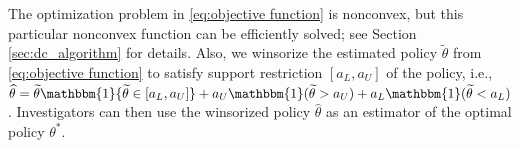 \documentclass[12pt]{article}
\newtheorem{remark}{Remark}
\newcommand{\E}{\mathbb{E}}
\newcommand{\R}{\mathbb{R}}
\newcommand{\ind}{\mathbbm{1}}
\begin{document}
The optimization problem in \eqref{eq:objective function} is nonconvex, but this particular nonconvex function can be efficiently solved; see Section \ref{sec:dc_algorithm} for details. Also, we winsorize the estimated policy $\widetilde{\theta}$ from \ref{eq:objective function} to satisfy support restriction $[a_L,a_U]$ of the policy, i.e.,
$\widehat{\theta} 
 = \widetilde{\theta} \ind\{ \widetilde{\theta}  \in [a_L,a_U] \} + a_U\ind ( \widetilde{\theta}  > a_U )+ a_L\ind ( \widetilde{\theta}  < a_L )$. Investigators can then use the winsorized policy $\widehat{\theta}$ as an estimator of the optimal policy $\theta^*$. 
 


   
\end{document}
